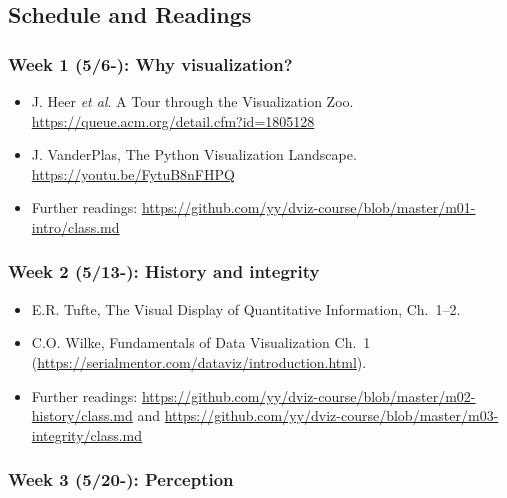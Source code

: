 \subsection{Schedule and Readings}\label{sub:schedule}%

\subsubsection{Week 1 (5/6-): Why visualization?} %

\begin{itemize}\itemsep0em 
\item J. Heer \emph{et al}. A Tour through the Visualization Zoo. \url{https://queue.acm.org/detail.cfm?id=1805128}
\item J. VanderPlas, The Python Visualization Landscape. \url{https://youtu.be/FytuB8nFHPQ}
\item Further readings: \url{https://github.com/yy/dviz-course/blob/master/m01-intro/class.md}
\end{itemize}	

\subsubsection{Week 2 (5/13-): History and integrity}%

\begin{itemize}\itemsep0em 
\item E.R. Tufte, The Visual Display of Quantitative Information, Ch.~1--2.
\item C.O. Wilke, Fundamentals of Data Visualization Ch.~1 (\url{https://serialmentor.com/dataviz/introduction.html}). 
\item Further readings: \url{https://github.com/yy/dviz-course/blob/master/m02-history/class.md} and \url{https://github.com/yy/dviz-course/blob/master/m03-integrity/class.md}
\end{itemize}	


\subsubsection{Week 3 (5/20-): Perception}%

